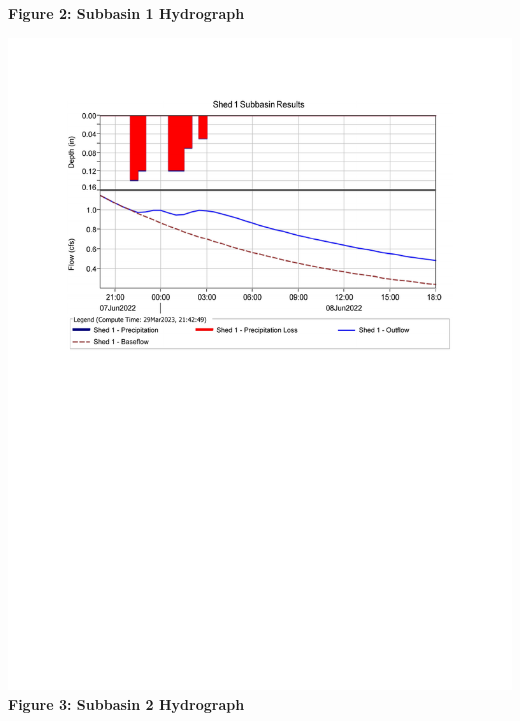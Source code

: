 \documentclass{article}
\begin{document}
\begin{center}
{\large{\bf Figure 2: Subbasin 1 Hydrograph\\}}
\includegraphics*[scale=0.7, trim = {0 13cm 0 3.1cm}]{results/Shed_1_Results.pdf}
\vspace{8mm}
{\large{\bf \\Figure 3: Subbasin 2 Hydrograph\\}}

\end{center}
\end{document}
